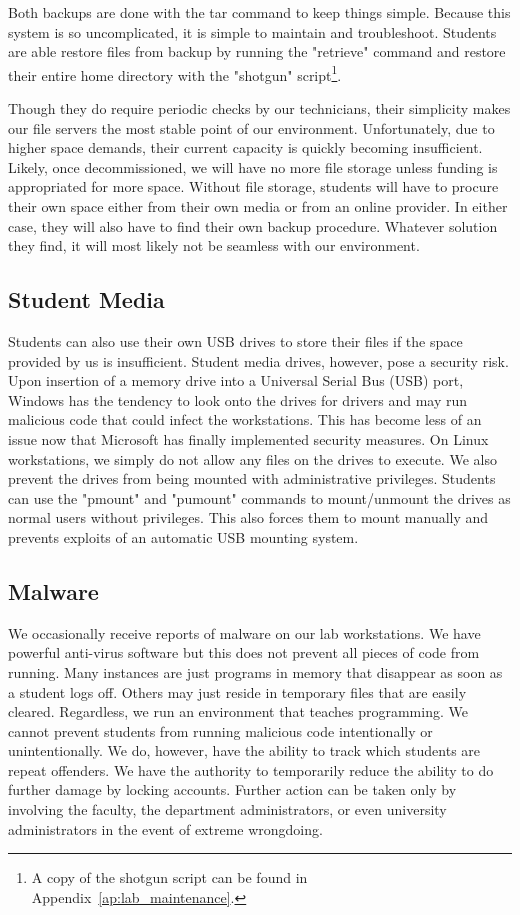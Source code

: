 Both backups are done with the tar command to keep things simple.  Because this system is so uncomplicated, it is simple to maintain and troubleshoot.  Students are able restore files from backup by running the "retrieve" command and restore their entire home directory with the "shotgun" script\footnote{A copy of the shotgun script can be found in Appendix~\ref{ap:lab_maintenance}.}.

Though they do require periodic checks by our technicians, their simplicity makes our file servers the most stable point of our environment.  Unfortunately, due to higher space demands, their current capacity is quickly becoming insufficient.  Likely, once decommissioned, we will have no more file storage unless funding is appropriated for more space.  Without file storage, students will have to procure their own space either from their own media or from an online provider.  In either case, they will also have to find their own backup procedure.  Whatever solution they find, it will most likely not be seamless with our environment. 

\subsection{Student Media}
Students can also use their own USB drives to store their files if the space provided by us is insufficient.  Student media drives, however, pose a security risk. Upon insertion of a memory drive into a Universal Serial Bus (USB) port, Windows has the tendency to look onto the drives for drivers and may run malicious code that could infect the workstations.  This has become less of an issue now that Microsoft has finally implemented security measures.  On Linux workstations, we simply do not allow any files on the drives to execute.  We also prevent the drives from being mounted with administrative privileges.  Students can use the "pmount" and "pumount" commands to mount/unmount the drives as normal users without privileges.  This also forces them to mount manually and prevents exploits of an automatic USB mounting system.  

\subsection{Malware}
We occasionally receive reports of malware on our lab workstations.  We have powerful anti-virus software but this does not prevent all pieces of code from running.  Many instances are just programs in memory that disappear as soon as a student logs off.  Others may just reside in temporary files that are easily cleared.  Regardless, we run an environment that teaches programming.  We cannot prevent students from running malicious code intentionally or unintentionally.  We do, however, have the ability to track which students are repeat offenders.  We have the authority to temporarily reduce the ability to do further damage by locking accounts.  Further action can be taken only by involving the faculty, the department administrators, or even university administrators in the event of extreme wrongdoing. 
